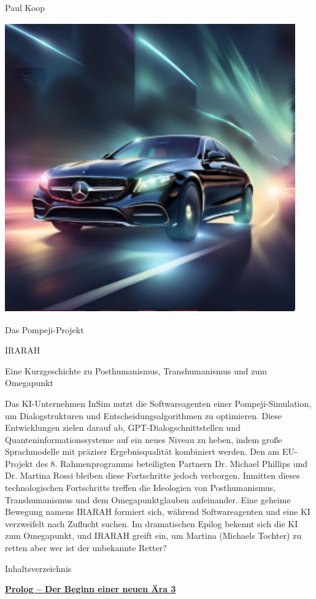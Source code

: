 \documentclass[
]{article}
\author{}
\date{}
\begin{document}
Paul Koop

\includegraphics[width=4.92849in,height=4.92031in]{media/image15.png}

Das Pompeji-Projekt

IRARAH

Eine Kurzgeschichte zu Posthumanismus, Transhumanismus und zum
Omegapunkt

Das KI-Unternehmen InSim nutzt die Softwareagenten einer
Pompeji-Simulation, um Dialogstrukturen und Entscheidungsalgorithmen zu
optimieren. Diese Entwicklungen zielen darauf ab,
GPT-Dialogschnittstellen und Quanteninformationssysteme auf ein neues
Niveau zu heben, indem große Sprachmodelle mit präziser Ergebnisqualität
kombiniert werden. Den am EU-Projekt des 8. Rahmenprogramms beteiligten
Partnern Dr. Michael Phillips und Dr. Martina Rossi bleiben diese
Fortschritte jedoch verborgen. Inmitten dieses technologischen
Fortschritts treffen die Ideologien von Posthumanismus, Transhumanismus
und dem Omegapunktglauben aufeinander. Eine geheime Bewegung namens
IRARAH formiert sich, während Softwareagenten und eine KI verzweifelt
nach Zuflucht suchen. Im dramatischen Epilog bekennt sich die KI zum
Omegapunkt, und IRARAH greift ein, um Martina (Michaels Tochter) zu
retten aber wer ist der unbekannte Retter?

Inhaltsverzeichnis

\hyperref[prolog-der-beginn-einer-neuen-uxe4ra]{\textbf{Prolog -- Der
Beginn einer neuen Ära 3}}
\end{document}
